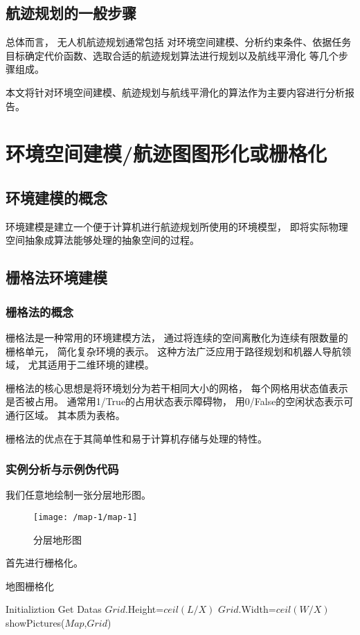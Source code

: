 \documentclass[12pt,a4paper,oneside,UTF8]{ctexart}
\begin{document}
\subsection{航迹规划的一般步骤}
总体而言，
无人机航迹规划通常包括
对环境空间建模、分析约束条件、依据任务目标确定代价函数、选取合适的航迹规划算法进行规划以及航线平滑化
等几个步骤组成。\cite{ref3}

本文将针对环境空间建模、航迹规划与航线平滑化的算法作为主要内容进行分析报告。
\newpage\section{环境空间建模/航迹图图形化或栅格化}
\subsection{环境建模的概念}
环境建模是建立一个便于计算机进行航迹规划所使用的环境模型，
即将实际物理空间抽象成算法能够处理的抽象空间的过程。
\subsection{栅格法环境建模}
\subsubsection{栅格法的概念}
栅格法是一种常用的环境建模方法，
通过将连续的空间离散化为连续有限数量的栅格单元，
简化复杂环境的表示。
这种方法广泛应用于路径规划和机器人导航领域，
尤其适用于二维环境的建模。

栅格法的核心思想是将环境划分为若干相同大小的网格，
每个网格用状态值表示是否被占用。
通常用1/True的占用状态表示障碍物，
用0/False的空闲状态表示可通行区域。
其本质为表格。

栅格法的优点在于其简单性和易于计算机存储与处理的特性。
\subsubsection{实例分析与示例伪代码}
我们任意地绘制一张分层地形图。

\begin{figure}[H]
  \centering
  \texttt{[image: /map-1/map-1]}
  \caption{分层地形图}
  \label{fig:map-1}
\end{figure}

首先进行栅格化。

\begin{algorithm}[H]
  \caption{地图栅格化}\label{algorithm-grid}

  Initializtion\;
  Get Datas\;
  $Grid$.Height=$ceil(L/X)$\;
  $Grid$.Width=$ceil(W/X)$\;
  showPictures($Map$,$Grid$)\;
\end{algorithm}
\end{document}

